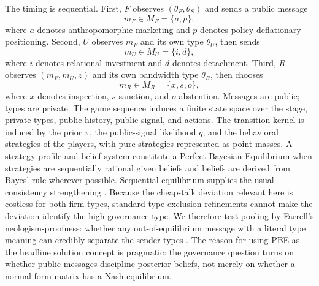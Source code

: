 The timing is sequential. First, $F$ observes $(\theta_F,\theta_S)$ and sends a
public message
\[
m_F \in M_F=\{a,p\},
\]
where $a$ denotes anthropomorphic marketing and $p$ denotes policy-deflationary
positioning. Second, $U$ observes $m_F$ and its own type $\theta_U$, then sends
\[
m_U \in M_U=\{i,d\},
\]
where $i$ denotes relational investment and $d$ denotes detachment. Third, $R$
observes $(m_F,m_U,z)$ and its own bandwidth type $\theta_R$, then chooses
\[
m_R \in M_R=\{x,s,o\},
\]
where $x$ denotes inspection, $s$ sanction, and $o$ abstention. Messages are
public; types are private. The game sequence induces a finite state space over
the stage, private types, public history, public signal, and actions. The transition
kernel is induced by the prior $\pi$, the public-signal likelihood $q$, and the
behavioral strategies of the players, with pure strategies represented as point masses.
A strategy profile and belief system constitute a
Perfect Bayesian Equilibrium when strategies are sequentially rational given
beliefs and beliefs are derived from Bayes' rule wherever possible. Sequential
equilibrium supplies the usual consistency strengthening \citep{kreps_wilson1982}.
Because the cheap-talk deviation relevant here is costless for both firm types,
standard type-exclusion refinements cannot make the deviation identify the
high-governance type. We therefore test pooling by Farrell's neologism-proofness:
whether any out-of-equilibrium message with a literal type meaning can credibly
separate the sender types \citep{farrell1993}. The reason for using PBE as the
headline solution concept is pragmatic: the governance question turns on whether
public messages discipline posterior beliefs, not merely on whether a normal-form
matrix has a Nash equilibrium.

